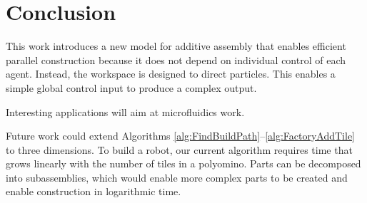
\section{Conclusion}\label{sec:Conclusion}

This work introduces a new model for additive assembly that enables efficient parallel construction because it does not depend on individual control of each agent.
Instead,   the workspace is designed  to direct particles. 
 This enables  a simple global control input to produce a complex output.

  Interesting applications will aim at microfluidics work.
  
 
  

Future work could extend Algorithms \ref{alg:FindBuildPath}--\ref{alg:FactoryAddTile} to three dimensions. 
To build a robot, our current algorithm requires time that grows linearly with the number of tiles in a polyomino.  
Parts can be decomposed into subassemblies, which would enable more complex parts to be created and enable construction in logarithmic time.

    